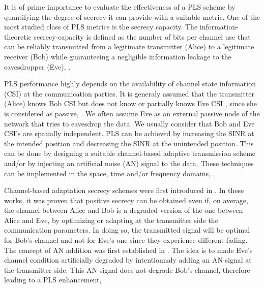 \documentclass[journal,comsoc]{IEEEtran}
\begin{document}
It is of prime importance to evaluate the effectiveness of a PLS scheme by quantifying the degree of secrecy it can provide with a suitable metric. One of the most studied class of PLS metrics is the secrecy capacity. The information-theoretic secrecy-capacity is defined as the number of bits per channel use that can be reliably transmitted from a legitimate transmitter (Alice) to a legitimate receiver (Bob) while guaranteeing a negligible information leakage to the eavesdropper (Eve), \cite{bloch_barros_2011}.

PLS performance highly depends on the availability of channel state information (CSI) at the communication parties. It is generaly assumed that the transmitter (Alice) knows Bob CSI but does not know or partially knows Eve CSI , since she is considered as passive, \cite{8509094}. We often assume Eve as an external passive node of the network that tries to eavesdrop the data. We usually consider that Bob and Eve CSI's are spatially independent. PLS can be achieved by increasing the SINR at the intended position and decreasing the SINR at the unintended position. This can be done by designing a suitable channel-based adaptive transmission scheme and/or by injecting an artificial noise (AN) signal to the data. These techniques can be implemented in the space, time and/or frequency domains, \cite{8509094,7762075,MELKI20191}.

Channel-based adaptation secrecy schemes were first introduced in \cite{4529264,4529282,4626059}. In these works, it was proven that positive secrecy can be obtained even if, on average, the channel between Alice and Bob is a degraded version of the one between Alice and Eve, by optimizing or adapting at the transmitter side the communication parameters. In doing so, the transmitted signal will be optimal for Bob's channel and not for Eve's one since they experience different fading. The concept of AN addition was first established in \cite{1558439,1605889,4543070}. The idea is to made Eve's channel condition artificially degraded by intentionnaly adding an AN signal at the transmitter side. This AN signal does not degrade Bob's channel, therefore leading to a PLS enhancement, \cite{8509094}
\end{document}
